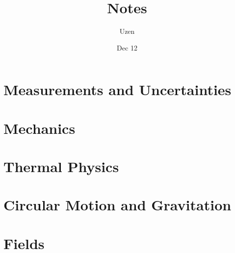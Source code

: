 \documentclass{report}
\title{Notes}
\author{Uzen}
\date{Dec 12}
\begin{document}
\maketitle
\tableofcontents

\chapter{Measurements and Uncertainties}


\chapter{Mechanics}


\chapter{Thermal Physics}


\chapter{Circular Motion and Gravitation}


\chapter{Fields}

\end{document}
